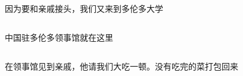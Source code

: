 ﻿\documentclass[hyperref={bookmarks=true},xcolor=pdflatex,svgnames,table,compress]{beamer}
\begin{document}
\subsection{}
\begin{frame}
\begin{ztebox}
因为要和亲戚接头，我们又来到多伦多大学
\end{ztebox}
\end{frame}

\subsection{}
\begin{frame}
\begin{ztebox}
中国驻多伦多领事馆就在这里
\end{ztebox}
\end{frame}

\subsection{}
\begin{frame}
\end{frame}

\subsection{}
\begin{frame}
\end{frame}

\subsection{}
\begin{frame}
\end{frame}

\subsection{}
\begin{frame}
\begin{ztebox}
在领事馆见到亲戚，他请我们大吃一顿。没有吃完的菜打包回来
\end{ztebox}
\end{frame}

\subsection{}
\begin{frame}
\begin{center}
\end{center}
\end{frame}
\end{document}
